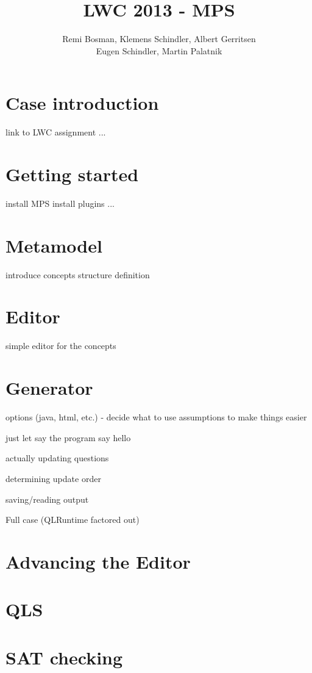 \documentclass[12pt]{article}
\begin{document}
\title{LWC 2013 - MPS}
\author{Remi Bosman, Klemens Schindler, Albert Gerritsen\\
Eugen Schindler, Martin Palatnik}

\maketitle

\section{Case introduction}
link to LWC assignment
...

\section{Getting started}
install MPS
install plugins
...

\section{Metamodel}
introduce concepts
structure definition

\section{Editor}
simple editor for the concepts

\section{Generator}
options (java, html, etc.) - decide what to use
assumptions to make things easier

just let say the program say hello

actually updating questions

determining update order

saving/reading output

Full case (QLRuntime factored out)

\section{Advancing the Editor}

\section{QLS}

\section{SAT checking}
\end{document}
